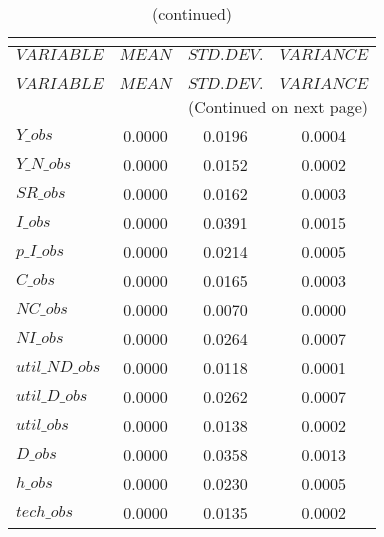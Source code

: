  
\begin{center}
\begin{longtable}{lccc} 
\caption{THEORETICAL MOMENTS}\\
 \label{Table:th_moments}\\
\toprule 
$VARIABLE       $	 & 	 $         MEAN$	 & 	 $    STD. DEV.$	 & 	 $     VARIANCE$\\
\midrule \endfirsthead 
\caption{(continued)}\\
 \toprule \\ 
$VARIABLE       $	 & 	 $         MEAN$	 & 	 $    STD. DEV.$	 & 	 $     VARIANCE$\\
\midrule \endhead 
\midrule \multicolumn{4}{r}{(Continued on next page)} \\ \bottomrule \endfoot 
\bottomrule \endlastfoot 
$Y\_obs         $	 & 	       0.0000	 & 	       0.0196	 & 	       0.0004 \\ 
$Y\_N\_obs      $	 & 	       0.0000	 & 	       0.0152	 & 	       0.0002 \\ 
$SR\_obs        $	 & 	       0.0000	 & 	       0.0162	 & 	       0.0003 \\ 
$I\_obs         $	 & 	       0.0000	 & 	       0.0391	 & 	       0.0015 \\ 
$p\_I\_obs      $	 & 	       0.0000	 & 	       0.0214	 & 	       0.0005 \\ 
$C\_obs         $	 & 	       0.0000	 & 	       0.0165	 & 	       0.0003 \\ 
$NC\_obs        $	 & 	       0.0000	 & 	       0.0070	 & 	       0.0000 \\ 
$NI\_obs        $	 & 	       0.0000	 & 	       0.0264	 & 	       0.0007 \\ 
$util\_ND\_obs  $	 & 	       0.0000	 & 	       0.0118	 & 	       0.0001 \\ 
$util\_D\_obs   $	 & 	       0.0000	 & 	       0.0262	 & 	       0.0007 \\ 
$util\_obs      $	 & 	       0.0000	 & 	       0.0138	 & 	       0.0002 \\ 
$D\_obs         $	 & 	       0.0000	 & 	       0.0358	 & 	       0.0013 \\ 
$h\_obs         $	 & 	       0.0000	 & 	       0.0230	 & 	       0.0005 \\ 
$tech\_obs      $	 & 	       0.0000	 & 	       0.0135	 & 	       0.0002 \\ 
\end{longtable}
 \end{center}
